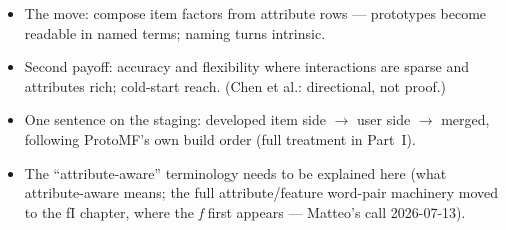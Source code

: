 \begin{itemize}
    \item The move: compose item factors from attribute rows — prototypes become readable in named terms; naming turns intrinsic.
    \item Second payoff: accuracy and flexibility where interactions are sparse and attributes rich; cold-start reach. (Chen et al.: directional, not proof.)
    \item One sentence on the staging: developed item side $\to$ user side $\to$ merged, following ProtoMF's own build order (full treatment in Part~I).
    \item The ``attribute-aware'' terminology needs to be explained here (what attribute-aware means; the full attribute/feature word-pair machinery moved to the fI chapter, where the \emph{f} first appears — Matteo's call 2026-07-13).
\end{itemize}

